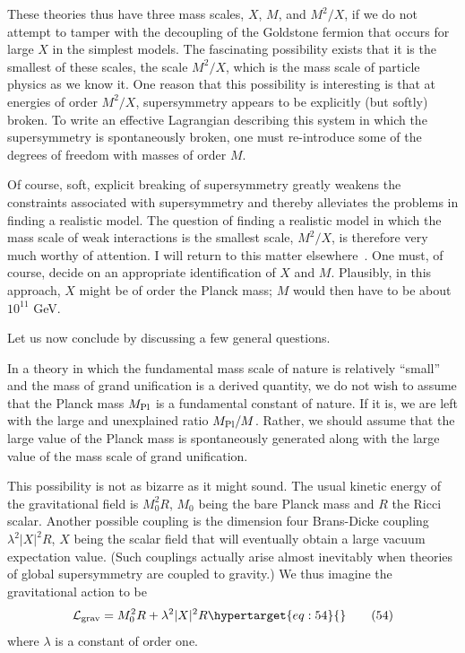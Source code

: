 \documentclass[11pt,a4paper]{article}
\newcommand{\eqtarget}[1]{\hypertarget{eq:#1}{\mathstrut}\tag{#1}}
\begin{document}
\begingroup
\renewcommand{\thefootnote}{\fnsymbol{footnote}}
\endgroup

These theories thus have three mass scales, $X$, $M$, and $M^2/X$, if
we do not attempt to tamper with the decoupling of the Goldstone
fermion that occurs for large $X$ in the simplest models. The fascinating
possibility exists that it is the smallest of these scales, the
scale $M^2/X$, which is the mass scale of particle physics as we know it.
One reason that this possibility is interesting is that at energies
of order $M^2/X$, supersymmetry appears to be explicitly (but softly)
broken. To write an effective Lagrangian describing this system in
which the supersymmetry is spontaneously broken, one must re-introduce
some of the degrees of freedom with masses of order $M$.

Of course, soft, explicit breaking of supersymmetry greatly
weakens the constraints associated with supersymmetry and thereby
alleviates the problems in finding a realistic model. The question
of finding a realistic model in which the mass scale of weak interactions
is the smallest scale, $M^2/X$, is therefore very much worthy
of attention. I will return to this matter elsewhere~\cite{ref19}. One must,
of course, decide on an appropriate identification of $X$ and $M$.
Plausibly, in this approach, $X$ might be of order the Planck mass;
$M$ would then have to be about $10^{11}$ GeV.

Let us now conclude by discussing a few general questions.

In a theory in which the fundamental mass scale of nature is
relatively ``small'' and the mass of grand unification is a derived
quantity, we do not wish to assume that the Planck mass $M_{\rm Pl}$ is a
fundamental constant of nature. If it is, we are left with the large
and unexplained ratio $M_{\rm Pl}/M$. Rather, we should assume that the large
value of the Planck mass is spontaneously generated along with the
large value of the mass scale of grand unification.

This possibility is not as bizarre as it might sound. The
usual kinetic energy of the gravitational field is $M_0^2 R$, $M_0$ being
the bare Planck mass and $R$ the Ricci scalar. Another possible
coupling is the dimension four Brans-Dicke coupling $\lambda^2 |X|^2 R$, $X$ being the
scalar field that will eventually obtain a large vacuum expectation
value. (Such couplings actually arise almost inevitably when theories
of global supersymmetry are coupled to gravity.) We thus
imagine the gravitational action to be
\begin{equation}
\mathcal{L}_{\rm grav} = M_0^2 R + \lambda^2 |X|^2 R
\eqtarget{54}
\end{equation}
where $\lambda$ is a constant of order one.
\end{document}

